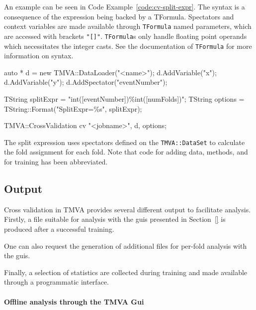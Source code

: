 An example can be seen in Code Example~\ref{code:cv-split-expr}. The syntax is a consequence of the expression being backed by a TFormula. Spectators and context variables are made available through \texttt{TFormula} named parameters, which are accessed with brackets \texttt{"[]"}. \texttt{TFormula}s only handle floating point operands which necessitates the integer casts. See the documentation of \texttt{TFormula} for more information on syntax.

\begin{codeexample}
\begin{tmvacode}
auto * d = new TMVA::DataLoader("<name>");
d.AddVariable("x");
d.AddVariable("y");
d.AddSpectator("eventNumber");

TString splitExpr = "int([eventNumber])\%int([numFolds])";
TString options = TString::Format("SplitExpr=\%s", splitExpr);

TMVA::CrossValidation cv {"<jobname>", d, options};
\end{tmvacode}
\caption[.]{\codeexampleCaptionSize The split expression uses spectators defined on the \texttt{TMVA::DataSet} to calculate the fold assignment for each fold. Note that code for adding data, methods, and for training has been abbreviated.
}
\label{code:cv-split-expr}
\end{codeexample}










\subsection{Output}
\label{sec:cv-output}

Cross validation in TMVA provides several different output to facilitate analysis. Firstly, a file suitable for analysis with the guis presented in Section~\ref{} is produced after a successful training.

One can also request the generation of additional files for per-fold analysis with the guis.

Finally, a selection of statistics are collected during training and made available through a programmatic interface.

\paragraph{Offline analysis through the TMVA Gui}
\label{sec:cv-output-files}

